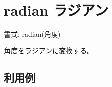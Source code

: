 
%

\section{radian ラジアン\label{sect:radian}}

書式: radian(角度)

角度をラジアンに変換する。

\subsection*{利用例}


%


